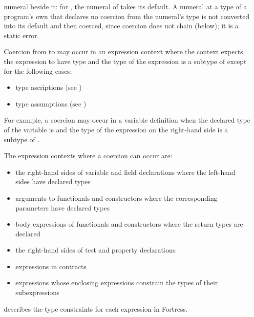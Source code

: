 numeral beside it: for , the numeral of 
takes its default.
A numeral at a type of a program's own that declares no coercion from the
numeral's type is not converted into its default and then coerced, since
coercion does not chain (below); it is a static error.

Coercion from  to  may occur in an expression context
where the context expects the expression to have type  and
the type of the expression is a subtype of  except for the following
cases:
\begin{itemize}
\item type ascriptions (see )
\item type assumptions (see )
\end{itemize}
For example, a coercion may occur in a variable definition when the
declared type of the variable is  and the type of the expression on
the right-hand side is a subtype of .


The expression contexts where a coercion can occur are:
\begin{itemize}
\item the right-hand sides of variable and field declarations where the
  left-hand sides have declared types
\item arguments to functionals and constructors where the corresponding
  parameters have declared types
\item body expressions of functionals and constructors where the return
  types are declared
\item the right-hand sides of test and property declarations
\item expressions in contracts
\item expressions whose enclosing expressions constrain the types of
  their subexpressions
\end{itemize}
 describes the type constraints for each expression in
Fortress.

